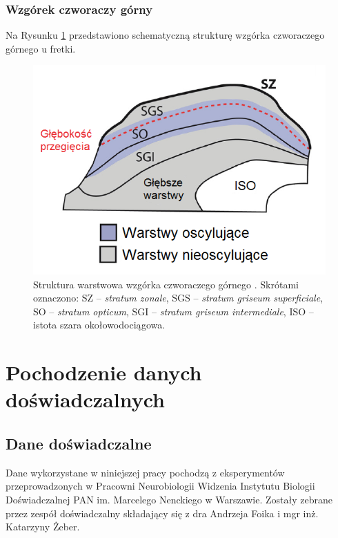 \documentclass{pracamgr_2}
\begin{document}
	\subsection{Wzgórek czworaczy górny}
	Na Rysunku \ref{rys:SC_warstwy} przedstawiono schematyczną strukturę wzgórka czworaczego górnego u fretki. 
	\begin{figure}[htbp]
		\begin{center}
			\includegraphics[scale=0.55]{SC_warstwy.png}
		\end{center}
		\caption{Struktura warstwowa wzgórka czworaczego górnego \citep{SC_warstwy}. Skrótami oznaczono: SZ -- \textit{stratum zonale}, SGS -- \textit{stratum griseum superficiale}, SO -- \textit{stratum opticum}, SGI -- \textit{stratum griseum intermediale}, ISO -- istota szara okołowodociągowa.}
		\label{rys:SC_warstwy}
	\end{figure}
	\chapter{Pochodzenie danych doświadczalnych}
	\section{Dane doświadczalne}
	Dane wykorzystane w niniejszej pracy pochodzą z eksperymentów przeprowadzonych w Pracowni Neurobiologii Widzenia Instytutu Biologii Doświadczalnej PAN im. Marcelego Nenckiego w Warszawie. Zostały zebrane przez zespół doświadczalny składający się z dra Andrzeja Foika i mgr inż. Katarzyny Żeber.
	
\end{document}
